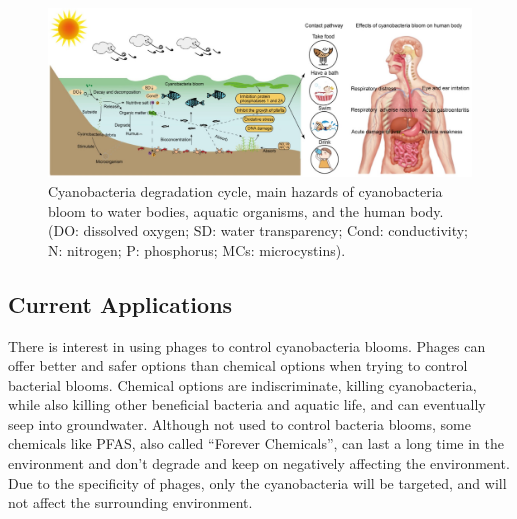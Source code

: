 \begin{figure}
    \centering
    \includegraphics[width=0.75\linewidth]{Figures/cyanobacteria_bloom_cycle.png} 
    \caption{Cyanobacteria degradation cycle, main hazards of cyanobacteria bloom to water bodies, aquatic organisms, and the human body. (DO: dissolved oxygen; SD: water transparency; Cond: conductivity; N: nitrogen; P: phosphorus; MCs: microcystins). \cite{zhangImpactCyanobacteriaBlooms2022}}
    \label{fig:cyanobacteria_bloom_cycle}
\end{figure}

\subsection{Current Applications}
    There is interest in using phages to control cyanobacteria blooms.
Phages can offer better and safer options than chemical options when trying to control bacterial blooms.
Chemical options are indiscriminate, killing cyanobacteria, while also killing other beneficial bacteria and aquatic life, and can eventually seep into groundwater.
Although not used to control bacteria blooms, some chemicals like PFAS, also called “Forever Chemicals”, can last a long time in the environment and don't degrade and keep on negatively affecting the environment.
Due to the specificity of phages, only the cyanobacteria will be targeted, and will not affect the surrounding environment. \newline

